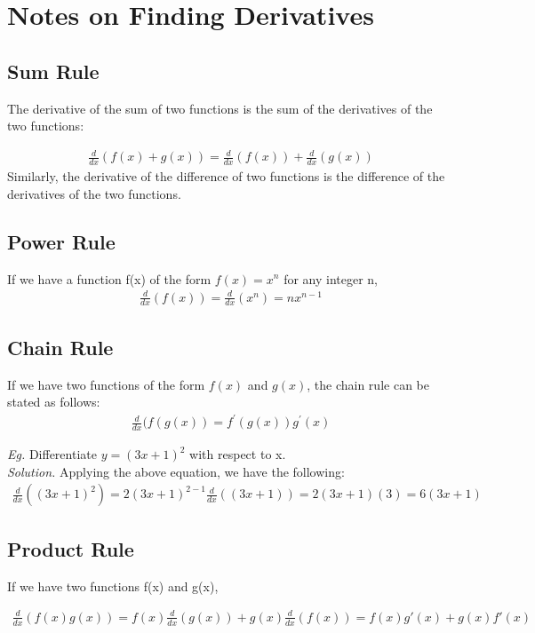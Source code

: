 \documentclass[12pt]{article}
\begin{document}
\section*{Notes on Finding Derivatives}
\subsection*{Sum Rule}
The derivative of the sum of two functions is the sum of the derivatives of the two functions: 

\begin{eqnarray*}
\frac{d}{dx}(f(x)+g(x)) = \frac{d}{dx}(f(x)) + \frac{d}{dx}(g(x))
\end{eqnarray*}
Similarly, the derivative of the difference of two functions is the difference of the derivatives of the two functions.


\subsection*{Power Rule}
If we have a function f(x) of the form $f(x)=x^{n}$ for any integer n,
\begin{eqnarray*}
\frac{d}{dx}(f(x)) = \frac{d}{dx}(x^{n}) = nx^{n-1}
\end{eqnarray*}


\subsection*{Chain Rule}
If we have two functions of the form $f(x)$ and $g(x)$, the chain rule can be stated as follows:
\begin{eqnarray*}
\frac{d}{dx}(f(g(x)) = f^{'}(g(x)) g^{'}(x)
\end{eqnarray*}

\noindent \textit{Eg.} Differentiate $y=(3x+1)^{2}$ with respect to x.\\
\textit{Solution.} Applying the above equation, we have the following: 
\begin{eqnarray*}
\frac{d}{dx}((3x+1)^{2}) = 2(3x+1)^{2-1} \frac{d}{dx}((3x+1)) = 2(3x+1)(3) = 6(3x+1)
\end{eqnarray*}

\subsection*{Product Rule}
If we have two functions f(x) and g(x),

\begin{eqnarray*}
\frac{d}{dx}(f(x)g(x)) = f(x)\frac{d}{dx}(g(x)) + g(x)\frac{d}{dx}(f(x))
= f(x)g'(x) + g(x)f'(x)
\end{eqnarray*}
\end{document}
